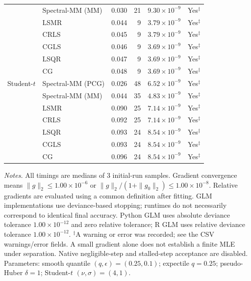 \documentclass[10pt,a4paper]{article}
\begin{document}
\begin{longtable}{llrrrc}
 & Spectral-MM (MM) & 0.030 & 21 & $9.30\times10^{-9}$ & Yes$^{\ddagger}$ \\
 & LSMR & 0.044 & 9 & $3.79\times10^{-9}$ & Yes$^{\ddagger}$ \\
 & CRLS & 0.045 & 9 & $3.79\times10^{-9}$ & Yes$^{\ddagger}$ \\
 & CGLS & 0.046 & 9 & $3.69\times10^{-9}$ & Yes$^{\ddagger}$ \\
 & LSQR & 0.047 & 9 & $3.69\times10^{-9}$ & Yes$^{\ddagger}$ \\
 & CG & 0.048 & 9 & $3.69\times10^{-9}$ & Yes$^{\ddagger}$ \\
\midrule
Student-$t$ & Spectral-MM (PCG) & 0.026 & 48 & $6.52\times10^{-9}$ & Yes$^{\ddagger}$ \\
 & Spectral-MM (MM) & 0.044 & 35 & $4.83\times10^{-9}$ & Yes$^{\ddagger}$ \\
 & LSMR & 0.090 & 25 & $7.14\times10^{-9}$ & Yes$^{\ddagger}$ \\
 & CRLS & 0.092 & 25 & $7.14\times10^{-9}$ & Yes$^{\ddagger}$ \\
 & LSQR & 0.093 & 24 & $8.54\times10^{-9}$ & Yes$^{\ddagger}$ \\
 & CGLS & 0.093 & 24 & $8.54\times10^{-9}$ & Yes$^{\ddagger}$ \\
 & CG & 0.096 & 24 & $8.54\times10^{-9}$ & Yes$^{\ddagger}$ \\
\end{longtable}
\noindent\textit{Notes.} All timings are medians of 3 initial-run samples.
Gradient convergence means $\|g\|_2\leq 1.00\times10^{-6}$ or $\|g\|_2/(1+\|g_0\|_2)\leq 1.00\times10^{-8}$.
Relative gradients are evaluated using a common definition after fitting. GLM implementations use deviance-based stopping; runtimes do not necessarily correspond to identical final accuracy.
Python GLM uses absolute deviance tolerance $1.00\times10^{-12}$ and zero relative tolerance; R GLM uses relative deviance tolerance $1.00\times10^{-12}$.
$^{\ddagger}$A warning or error was recorded; see the CSV warnings/error fields. A small gradient alone does not establish a finite MLE under separation.
Native negligible-step and stalled-step acceptance are disabled.
Parameters: smooth quantile $(q,\epsilon)=(0.25,0.1)$; expectile $q=0.25$; pseudo-Huber $\delta=1$; Student-$t$ $(\nu,\sigma)=(4,1)$.
\par
\endgroup
\end{document}
